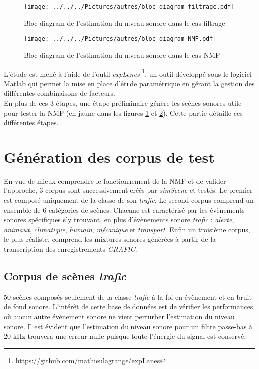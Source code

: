 \begin{figure}[t]
\centering
\texttt{[image: ../../../Pictures/autres/bloc\_diagram\_filtrage.pdf]}
\caption{Bloc diagram de l'estimation du niveau sonore dans le cas  \og filtrage \fg{}}
\label{fig:bloc_diag_filtre}
\end{figure}

\begin{figure}[t]
\centering
\texttt{[image: ../../../Pictures/autres/bloc\_diagram\_NMF.pdf]}
\caption{Bloc diagram de l'estimation du niveau sonore dans le cas \og NMF \fg{}}
\label{fig:bloc_diag_nmf}
\end{figure}



L'étude est mené à l'aide de l'outil \textit{expLanes} \footnote{\url{https://github.com/mathieulagrange/expLanes}}, un outil développé sous le logiciel Matlab qui permet la mise en place d'étude paramétrique en gérant la gestion des différentes combinaisons de facteurs.\\

En plus de ces 3 étapes, une étape préliminaire génère les scènes sonores utile pour tester la NMF (en jaune dans les figures \ref{fig:bloc_diag_filtre} et \ref{fig:bloc_diag_nmf}). Cette partie détaille ces différentes étapes. 

\section{Génération des corpus de test}
En vue de mieux comprendre le fonctionnement de la NMF et de valider l'approche, 3 corpus sont successivement créés par \textit{simScene} et testés. Le premier est composé uniquement de la classe de son \textit{trafic}. Le second corpus comprend un ensemble de 6 catégories de scènes. Chacune est caractérisé par les évènements sonores spécifiques s'y trouvant, en plus d'évènements sonore \textit{trafic} : \textit{alerte}, \textit{animaux}, \textit{climatique}, \textit{humain}, \textit{mécanique} et \textit{transport}. Enfin un troisième corpus, le plus réaliste, comprend les mixtures sonores générées à partir de la transcription des enregistrements \textit{GRAFIC}.

\subsection{Corpus de scènes \textit{trafic}}
50 scènes composés seulement de la classe \textit{trafic} à la foi en évènement et en bruit de fond sonore. L'intérêt de cette base de données est de vérifier les performances où aucun autre évènement sonore ne vient perturber l'estimation du niveau sonore. Il est évident que l'estimation du niveau sonore pour un filtre passe-bas à 20 kHz trouvera une erreur nulle puisque toute l'énergie du signal est conservé. 

